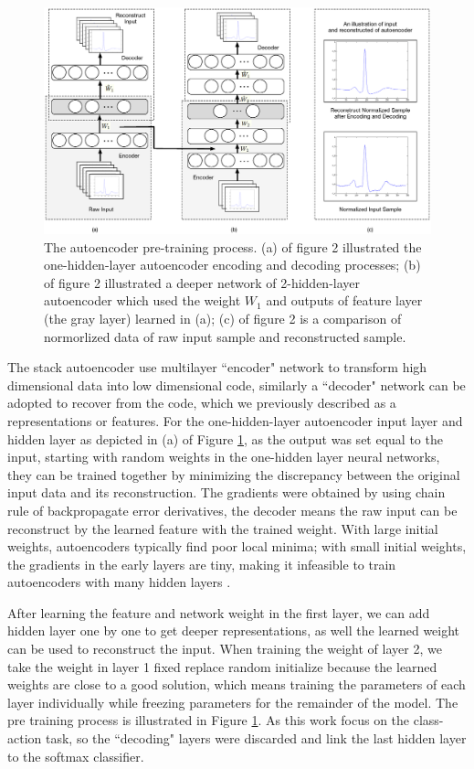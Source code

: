 \documentclass[journal]{IEEEtran}
\begin{document}
\begin{figure}[]
\centering
\includegraphics[width=6.5 in]{Figure2}
\caption{The autoencoder pre-training process. (a) of figure 2 illustrated the one-hidden-layer autoencoder encoding and decoding processes; (b) of figure 2 illustrated a deeper network of 2-hidden-layer autoencoder which used the weight $W_1$ and outputs of feature layer (the gray layer) learned in (a); (c) of figure 2 is a comparison of normorlized data of raw input sample and reconstructed sample.}
\label{figure2}
\end{figure}

The stack autoencoder use multilayer ``encoder" network to transform high dimensional data into low dimensional code, similarly a ``decoder" network can be adopted to recover from the code, which we previously described as a representations or features. For the one-hidden-layer autoencoder input layer and hidden layer as depicted in (a) of Figure \ref{figure2}, as the output was set equal to the input, starting with random weights in the one-hidden layer neural networks, they can be trained together by minimizing the discrepancy between the original input data and its reconstruction. The gradients were obtained by using chain rule of backpropagate error derivatives, the decoder means the raw input can be reconstruct by the learned feature with the trained weight.
With large initial weights, autoencoders typically find poor local minima; with small initial weights, the gradients in the early layers are tiny, making it infeasible to train autoencoders with many hidden layers \cite{hinton}. 

After learning the feature and network weight in the first layer, we can add hidden layer one by one to get deeper representations, as well the learned weight can be used to reconstruct the input. When training the weight of layer 2, we take the weight in layer 1 fixed replace random initialize because the learned weights are close to a good solution, which means training the parameters of each layer individually while freezing parameters for the remainder of the model. The pre training process is illustrated in Figure \ref{figure2}. As this work focus on the class-action task, so the ``decoding" layers were discarded and link the last hidden layer to the softmax classifier. 
\end{document}

